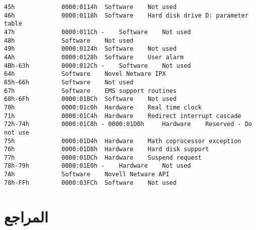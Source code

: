 \documentclass[document.tex]{subfiles}
\begin{document}
\begin{english}
\begin{lstlisting}[label=lst:bootloader_hex,caption=Some Code]
45h 			0000:0114h 	Software 	Not used
46h 			0000:0118h 	Software 	Hard disk drive D: parameter table
47h 			0000:011Ch - 	Software 	Not used
48h 	  		Software 	Not used
49h 			0000:0124h 	Software 	Not used
4Ah 			0000:0128h 	Software 	User alarm
4Bh-63h 		0000:012Ch - 	Software 	Not used
64h 	  		Software 	Novel Netware IPX
65h-66h 	  	Software 	Not used
67h 	  		Software 	EMS support routines
68h-6Fh 		0000:01BCh 	Software 	Not used
70h 			0000:01c0h 	Hardware 	Real time clock
71h 			0000:01C4h 	Hardware 	Redirect interrupt cascade
72h-74h 		0000:01C8h - 0000:01D0h 	Hardware 	Reserved - Do not use
75h 			0000:01D4h 	Hardware 	Math coprocessor exception
76h 			0000:01D8h 	Hardware 	Hard disk support
77h 			0000:01DCh 	Hardware 	Suspend request
78h-79h 		0000:01E0h - 	Hardware 	Not used
7Ah 	  		Software 	Novell Netware API
78h-FFh 		0000:03FCh 	Software 	Not used

\end{lstlisting}
\end{english}

\chapter{المراجع}
\end{document}
